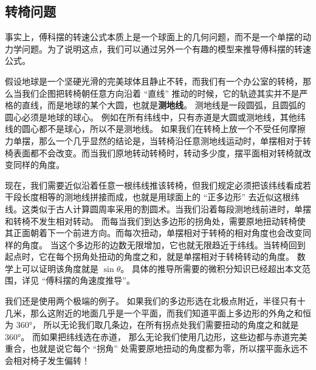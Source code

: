 \subsection{转椅问题}
事实上，傅科摆的转速公式本质上是一个球面上的几何问题，而不是一个单摆的动力学问题。为了说明这点，我们可以通过另外一个有趣的模型来推导傅科摆的转速公式。

假设地球是一个坚硬光滑的完美球体且静止不转，而我们有一个办公室的转椅，那么当我们企图把转椅朝任意方向沿着 “直线” 推动的时候，它的轨迹其实并不是严格的直线，而是地球的某个大圆，也就是\textbf{测地线}。 测地线是一段圆弧，且圆弧的圆心必须是地球的球心。 例如在所有纬线中，只有赤道是大圆或测地线，其他纬线的圆心都不是球心，所以不是测地线。 如果我们在转椅上放一个不受任何摩擦力单摆，那么一个几乎显然的结论是，当转椅沿任意测地线运动时，单摆相对于转椅表面都不会改变。而当我们原地转动转椅时，转动多少度，摆平面相对转椅就改变同样的角度。

现在，我们需要近似沿着任意一根纬线推该转椅，但我们规定必须把该纬线看成若干段长度相等的测地线拼接而成，也就是用球面上的 “正多边形” 去近似这根纬线。这类似于古人计算圆周率采用的割圆术。当我们沿着每段测地线前进时，单摆和转椅不发生相对转动。 而每当我们到达多边形的拐角处，需要原地扭动转椅使其正面朝着下一个前进方向。而每次扭动，单摆相对于转椅的相对角度也会改变同样的角度。 当这个多边形的边数无限增加，它也就无限趋近于纬线。当转椅回到起点时，它在每个拐角处扭动的角度之和，就是单摆相对于转椅转动的角度。 数学上可以证明该角度就是 $\sin\theta$。 具体的推导所需要的微积分知识已经超出本文范围，详见 “傅科摆的角速度推导”。

我们还是使用两个极端的例子。 如果我们的多边形选在北极点附近，半径只有十几米，那么这附近的地面几乎是一个平面，而我们知道平面上多边形的外角之和恒为 360°， 所以无论我们取几条边，在所有拐点处我们需要扭动的角度之和就是 360°。 而如果把纬线选在赤道， 那么无论我们使用几边形，这些边都与赤道完美重合，也就是说它每个 “拐角” 处需要原地扭动的角度都为零，所以摆平面永远不会相对椅子发生偏转！
